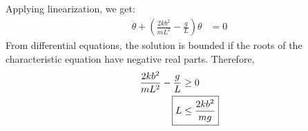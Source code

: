 \subsection{}
Applying linearization, we get:
\begin{align*}
    \ddot{\theta} + \left(\frac{2kb^2}{mL^2} - \frac{g}{L}\right) \theta &= 0
\end{align*}
From differential equations, the solution is bounded if the roots of the characteristic equation have negative real parts. Therefore,
\begin{align*}
    \frac{2kb^2}{mL^2} - \frac{g}{L} &\geq 0 \\
    \Aboxed{L &\leq \frac{2kb^2}{mg}}
\end{align*}
